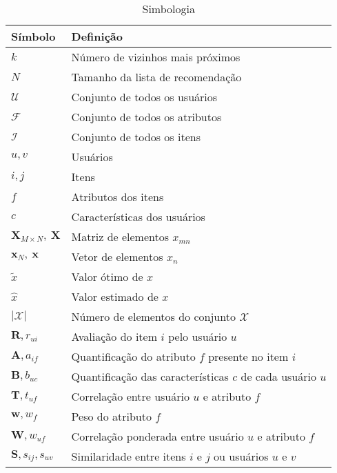 \begin{table}[hp]
\begin{center}
    \caption{Simbologia}
    \label{tab:simbologia}
    \begin{tabular}{ | l | l | }
    \hline
    \textbf{Símbolo} & \textbf{Definição} \\ \hline \hline
    $k$ & Número de vizinhos mais próximos \\ \hline
    $N$ & Tamanho da lista de recomendação \\ \hline \hline
    $\mathcal{U}$ & Conjunto de todos os usuários \\ \hline
    $\mathcal{F}$ & Conjunto  de todos os atributos \\ \hline
    $\mathcal{I}$ & Conjunto de todos os itens \\ \hline \hline
    $u, v$ & Usuários \\ \hline
    $i, j$ & Itens \\ \hline
    $f$ & Atributos dos itens \\ \hline
    $c $ & Características dos usuários \\ \hline \hline
    $\mathbf{X}_{M \times N},~\mathbf{X}$ & Matriz de elementos $x_{mn}$ \\ \hline
    $\mathbf{x}_{N},~\mathbf{x}$ & Vetor de elementos $x_{n}$ \\ \hline
    $\tilde{x}$ & Valor ótimo de $x$ \\ \hline    
    $\hat{x}$ & Valor estimado de $x$ \\ \hline    
    $|\mathcal{X}|$ & Número de elementos do conjunto $\mathcal{X}$ \\ \hline \hline
    $\mathbf{R}, r_{ui}$ & Avaliação do item $i$ pelo usuário $u$\\ \hline
    $\mathbf{A}, a_{if}$ & Quantificação do atributo $f$ presente no item $i$ \\ \hline
    $\mathbf{B}, b_{uc}$ & Quantificação das características $c$ de cada usuário $u$ \\ \hline    
    $\mathbf{T}, t_{uf}$ & Correlação entre usuário $u$ e atributo $f$ \\ \hline
    $\mathbf{w}, w_{f}$ & Peso do atributo $f$ \\ \hline
    $\mathbf{W}, w_{uf}$ & Correlação ponderada entre usuário $u$ e atributo $f$ \\ \hline
    $\mathbf{S}, s_{ij}, s_{uv}$ & Similaridade entre itens $i$ e $j$ ou usuários $u$ e $v$\\ \hline
    \end{tabular}
\end{center}
\end{table}


